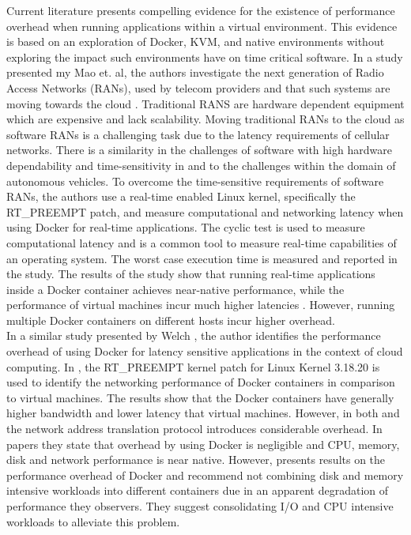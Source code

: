 Current literature \cite{p6} presents compelling evidence for the existence of performance overhead when running applications within a virtual environment. This evidence is based on an exploration of Docker, KVM, and native environments without exploring the impact such environments have on time critical software. In a study presented my Mao et. al, the authors investigate the next generation of Radio Access Networks (RANs), used by telecom providers and that such systems are moving towards the cloud \cite{p1}. Traditional RANS are hardware dependent equipment which are expensive and lack scalability. Moving traditional RANs to the cloud as software RANs is a challenging task due to the latency requirements of cellular networks. There is a similarity in the challenges of software with high hardware dependability and time-sensitivity in \cite{p1} and to the challenges within the domain of autonomous vehicles. To overcome the time-sensitive requirements of software RANs, the authors use a real-time enabled Linux kernel, specifically the RT\_PREEMPT patch, and measure computational and networking latency when using Docker for real-time applications. The cyclic test \cite{cycl} is used to measure computational latency and is a common tool to measure real-time capabilities of an operating system. The worst case execution time is measured and reported in the study. The results of the study show that running real-time applications inside a Docker container achieves near-native performance, while the performance of virtual machines incur much higher latencies \cite{p1}. However, running multiple Docker containers on different hosts incur higher overhead. \\

In a similar study presented by Welch \cite{c2}, the author identifies the performance overhead of using Docker for latency sensitive applications in the context of cloud computing. In \cite{c2}, the RT\_PREEMPT kernel patch for Linux Kernel 3.18.20 is used to identify the networking performance of Docker containers in comparison to virtual machines. The results show that the Docker containers have generally higher bandwidth and lower latency that virtual machines. However, in both \cite{Andreas} and \cite{p6} the network address translation protocol introduces considerable overhead. In papers \cite{p6,p3,p4,p7,c1} they state that overhead by using Docker is negligible and CPU, memory, disk and network performance is near native. However, \cite{p5} presents results on the performance overhead of Docker and recommend not combining disk and memory intensive workloads into different containers due in an apparent degradation of performance they observers. They suggest consolidating I/O and CPU intensive workloads to alleviate this problem. 


